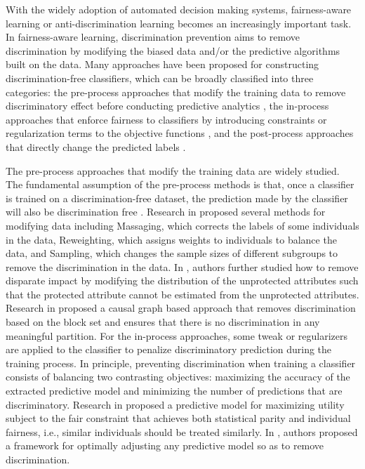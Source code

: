 \documentclass[sigconf]{acmart}
\theoremstyle{definition}
\begin{document}
With the widely adoption of automated decision making systems, fairness-aware learning or anti-discrimination learning becomes an increasingly important task. In fairness-aware learning,  discrimination prevention aims to remove discrimination by modifying the biased data and/or the predictive algorithms built on the data. Many approaches have been proposed for constructing discrimination-free classifiers, which can be broadly classified into three categories: the pre-process approaches that modify the training data to remove discriminatory effect before conducting predictive analytics \cite{Calders2009Building,Dwork2011Fairness,Zhang2017Causal,Feldman2015Certifying}, the in-process approaches that enforce fairness to  classifiers by introducing constraints or regularization terms to the objective functions \cite{Kamishima2011FairnessAware,Zafar2017Fairness}, and the post-process approaches that directly change the predicted labels \cite{Kamiran2010Discrimination,Hardt2016Equality}. 

The pre-process approaches that modify the training data are widely studied. The fundamental assumption of the pre-process methods is that, once a classifier is trained on a discrimination-free dataset, the prediction made by the classifier will also be discrimination free \cite{Kamiran2009Classifying}. Research in \cite{Kamiran2012Data} proposed several methods for modifying data including Massaging, which corrects the labels of some individuals in the data, Reweighting, which assigns weights to individuals to balance the data, and Sampling, which changes the sample sizes of different subgroups to remove the discrimination in the data. In \cite{Feldman2015Certifying}, authors further studied how to remove disparate impact by modifying the distribution of the unprotected attributes such that the protected attribute cannot be estimated from the unprotected attributes. Research in \cite{Zhang2017Achieving} proposed a causal graph based approach that removes discrimination based on the block set and ensures that there is no discrimination in any meaningful partition. For the in-process approaches, some tweak or regularizers are applied to the classifier to penalize discriminatory prediction during the training process. In principle, preventing discrimination when training a classifier consists of balancing two contrasting objectives: maximizing the accuracy of the extracted predictive model and minimizing the number of predictions that are discriminatory. Research in \cite{Dwork2011Fairness} proposed a predictive model for maximizing utility subject to the fair constraint that achieves both statistical parity and individual fairness, i.e., similar individuals should be treated similarly. In \cite{Hardt2016Equality}, authors proposed a framework for optimally adjusting any predictive model so as to remove discrimination.
\end{document}
